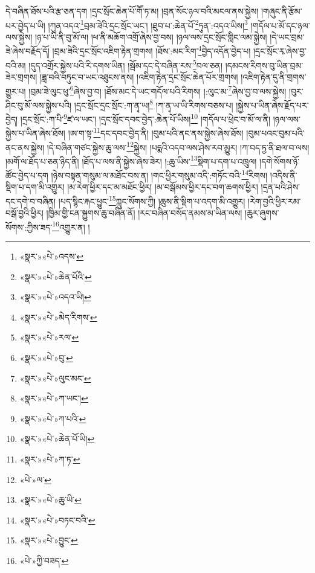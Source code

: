 དེ་བཞིན་ཐོས་པའི་རྩ་ཅན་དག །དྲང་སྲོང་ཆེན་པོ་གཽ་ཏ་མ། །བྲན་སོང་ཉལ་བའི་མངལ་ནས་སྐྱེས། །གཞུང་ནི་རྩོམ་པར་བྱེད་པ་ཡི། །ཀུན་འདའ་\footnote{«སྣར་»«པེ་»འདས་}བྲམ་ཟེའི་དྲང་སྲོང་ཡང་། །ཐུབ་པ་:ཆེན་པོ་\footnote{«སྣར་»«པེ་»ཆེན་པོའི་}ཏུན་:འདའ་ཡིས།\footnote{«སྣར་»«པེ་»འདའ་ཡི།} །གདོལ་པ་མོ་དང་ཉལ་ལས་སྐྱེས། །ཉ་པ་ཡི་ནི་བུ་མོ་ལ། །ཕ་ནི་མཆོག་འགྲོ་ཞེས་བྱ་བས། །ཉལ་ལས་དྲང་སྲོང་གླིང་ལམ་སྐྱེས། །དེ་ཡང་བྲམ་ཟེ་ཞེས་བརྗོད་དོ། །བྲམ་ཟེའི་དྲང་སྲོང་འཇིག་རྟེན་གྲགས། །ཐོས་:མང་རིག་\footnote{«སྣར་»«པེ་»མེད་རིགས་}བྱེད་འདོན་བྱེད་པ། །དྲང་སྲོང་རྭ་ཞེས་བྱ་བའི་མ། །དུད་འགྲོར་སྐྱེས་པའི་རི་དགས་ཡིན། །སྦོམ་དང་དེ་བཞིན་རས་\footnote{«སྣར་»«པེ་»རལ་}བལ་ཅན། །དམངས་རིགས་བུ་ཡིན་བྲམ་ཟེར་གྲགས། །ཟླ་བའི་བཏུང་བ་ཡང་འཐུངས་ནས། །འཇིག་རྟེན་དྲང་སྲོང་ཆེན་པོར་གྲགས། །འཇིག་རྟེན་དུ་ནི་གྲགས་གྱུར་པ། །བྲམ་ཟེ་ལུང་ཕུ་\footnote{«སྣར་»«པེ་»བུ་}ཞེས་བྱ་བ། །ཐོས་མང་དེ་ཡང་གདོལ་པའི་རིགས། །:ལུང་མ་\footnote{«སྣར་»«པེ་»ལུང་མང་}ཞེས་བྱ་བ་ལས་སྐྱེས། །བུར་ཤིང་བུ་མོ་ལས་སྐྱེས་པའི། །དྲང་སྲོང་དྲང་སྲོང་:ཀ་ནྭ་ཡ།\footnote{«སྣར་»«པེ་»ཀ་ཡང་།} །ཀ་ནྭ་ཡ་ཡི་རིགས་བཅས་པ། །སྐྱེས་པ་ཡིན་ཞེས་རྗོད་པར་བྱེད། །དྲང་སྲོང་:ཀ་པི་\footnote{«སྣར་»«པེ་»ཀ་པའི་}ཛ་ལ་ཡང་། །དྲང་སྲོང་དབང་བྱེད་:ཆེན་པོ་ཡིས།\footnote{«སྣར་»«པེ་»ཆེན་པོ་ཡི།} །གདོལ་པ་ཕྲེང་བ་མོ་ལ་ནི། །ཉལ་ལས་སྐྱེས་པ་ཡིན་ཞེས་ཐོས། །ཨ་ག་སྟ་\footnote{«སྣར་»«པེ་»ཀ་ཏ་}དང་དབང་བྱེད་ནི། །བུམ་པའི་ནང་ནས་སྐྱེས་ཞེས་ཐོས། །བུམ་པའང་བུམ་པའི་ནང་ནས་སྐྱེས། །དེ་བཞིན་གཙང་སྐྱེས་ཆུ་ལས་\footnote{«པེ་»ལ་}སྐྱེས། །པདྨའི་འདབ་ལས་ཤེས་རབ་མྱུར། །ཀ་བད་ཏྱ་ནི་ཐལ་བ་ལས། །མགོ་ལ་ཐོད་པ་ཅན་ཉིད་ནི། །ཐོད་པ་ལས་ནི་སྐྱེས་ཞེས་ཟེར། །:ཆུ་ཡིས་\footnote{«སྣར་»«པེ་»ཆུ་ཡི་}སྡིག་པ་དག་པ་འཁྲུལ། །དགེ་སོགས་ཉོ་ཚོང་བྱེད་པ་དག །ཉེས་བསྟན་གསུམ་ལ་མཐོང་བས་ན། །གང་ཕྱིར་གསུམ་འདི་:གཏོང་བའི་\footnote{«སྣར་»«པེ་»བཏང་བའི་}རིགས། །འདིས་ནི་སྡིག་པ་དག་མི་འགྱུར། །མ་རེག་ཕྱིར་དང་མ་མཐོང་ཕྱིར། །མ་བསྒོམས་ཕྱིར་དང་བག་ཆགས་ཕྱིར། །དྲན་པའི་ཤེས་དང་དགེ་བ་བཞིན། །པད་སྙིང་རྐང་ཕྱུང་\footnote{«སྣར་»«པེ་»བྱུང་}ཀླུང་སོགས་ཀྱི། །ཆུས་ནི་སྡིག་པ་འདག་མི་འགྱུར། །རེག་བྱའི་ཕྱིར་རམ་བསྒོ་བྱའི་ཕྱིར། །ཁྱིམ་གྱི་ངན་སྐྱུགས་ཆུ་བཞིན་ནོ། །རང་བཞིན་བསོད་ནམས་མ་ཡིན་ལས། །ཆུར་ཞུགས་སོགས་:ཀྱིས་ཟད་\footnote{«པེ་»ཀྱི་བཟད་}འགྱུར་ན། །

